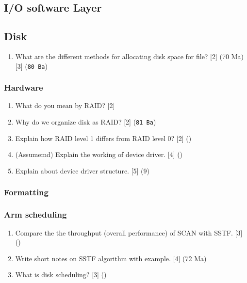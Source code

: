 \documentclass[12pt]{article}
\begin{document}
	\subsection{I/O software Layer}
	\subsection{Disk}
		\begin{enumerate}
			\item What are the different methods for allocating disk space for file? \hfill [2] (70 Ma) [3] (\texttt{80 Ba})
		\end{enumerate}
		\subsubsection{Hardware}
			\begin{enumerate}
				\item What do you mean by RAID? \hfill [2] 
				
				\item Why do we organize disk as RAID? \hfill [2] (\texttt{81 Ba})

				\item Explain how RAID level 1 differs from RAID level 0? \hfill [2] ()

				\item (Assumemd) Explain the working of device driver. \hfill [4] ()

				\item Explain about device driver structure. \hfill [5] (9)
			\end{enumerate}
		\subsubsection{Formatting}
		\subsubsection{Arm scheduling}
			\begin{enumerate}
				\item Compare the the throughput (overall performance) of SCAN with SSTF. \hfill [3] ()

				\item Write short notes on SSTF algorithm with example. \hfill [4] (72 Ma)

				\item What is disk scheduling? \hfill [3] ()
			\end{enumerate}
\end{document}
